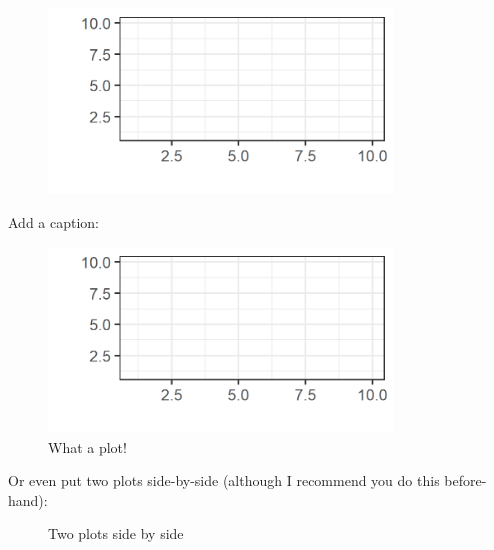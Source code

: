 \documentclass{article}
\begin{document}
\begin{figure}[!ht]
	\centering
	\includegraphics[width=3.6in]{figures/plot.png}
\end{figure}

Add a caption:

\begin{figure}[!ht]
	\centering
    \caption{What a plot!}
	\includegraphics[width=3.6in]{figures/plot.png}
\end{figure}

Or even put two plots side-by-side (although I recommend you do this before-hand):

\begin{figure}[ht]
    \centering
    \qquad
    \caption{Two plots side by side}
\end{figure}
\end{document}
